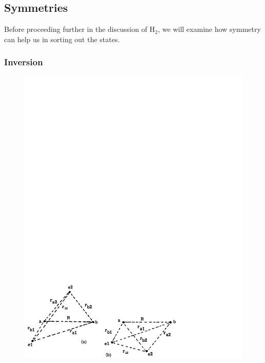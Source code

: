 \subsection{Symmetries}

Before proceeding further in the discussion of H$_2$, we will examine
how symmetry can help us in sorting out the states.

\subsubsection{Inversion}
    
\begin{figure}
\begin{center}
\includegraphics[scale=0.75]{fig2-18}
\end{center}
\caption{}
\label{fig2-18}
\end{figure}

